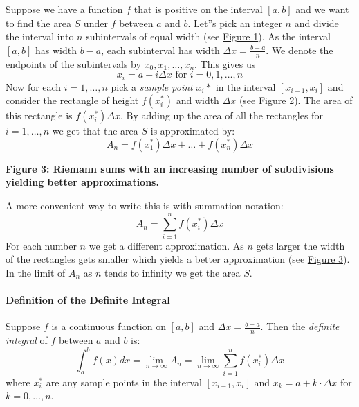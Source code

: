 Suppose we have a function $f$ that is positive on the interval $[a,b]$ and we want to find the area $S$ under $f$ between $a$ and $b$. Let''s pick an integer $n$ and divide the interval into $n$ subintervals of equal width (see \href{https://upload.wikimedia.org/wikipedia/commons/thumb/5/52/Riemann_Integration_3.png/300px-Riemann_Integration_3.png}{Figure 1}). As the interval $[a,b]$ has width $b-a$, each subinterval has width $\Delta x = \frac{b-a}{n}$. We denote the endpoints of the subintervals by $x_0,x_1,\ldots,x_n$. This gives us
$$
x_i = a + i \Delta x \text{ for } i = 0,1,\dots,n
$$
Now for each $i = 1,\ldots,n$ pick a \textit{sample point} $x_{i}\ast$ in the interval $[x_{i-1},x_i]$ and consider the rectangle of height $f(x_i^*)$ and width $\Delta x$ (see \href{https://upload.wikimedia.org/wikipedia/commons/thumb/5/55/Riemann_Integration_2.png/300px-Riemann_Integration_2.png}{Figure 2}). The area of this rectangle is $f(x_{i}^\ast) \Delta x$. By adding up the area of all the rectangles for $i = 1,\ldots,n$ we get that the area $S$ is approximated by:
$$
A_n = f(x_1^\ast) \Delta x + \dots + f(x_{n}^\ast) \Delta x
$$

\textbf{Figure 3: Riemann sums with an increasing number of subdivisions yielding better approximations.}



A more convenient way to write this is with summation notation:
$$
A_n = \sum_{i=1}^n f(x_i^\ast) \Delta x
$$
For each number $n$ we get a different approximation. As $n$ gets larger the width of the rectangles gets smaller which yields a better approximation (see \href{https://upload.wikimedia.org/wikipedia/commons/1/1d/Riemann2.gif}{Figure 3}). In the limit of $A_n$ as $n$ tends to infinity we get the area $S$.



\paragraph{Definition of the Definite Integral}



Suppose $f$ is a continuous function on $[a,b]$ and $\Delta x = \frac{b-a}{n}$. Then the \textit{definite integral} of $f$ between $a$ and $b$ is:
$$
\int_a^b f(x) dx = \lim_{n \to \infty} A_n = \lim_{n \to \infty} \sum_{i=1}^n f(x_i^*) \Delta x
$$
where $x_i^*$ are any sample points in the interval $[x_{i-1}, x_i]$ and $x_k = a + k \cdot \Delta x$ for $k = 0, \dots, n$.



